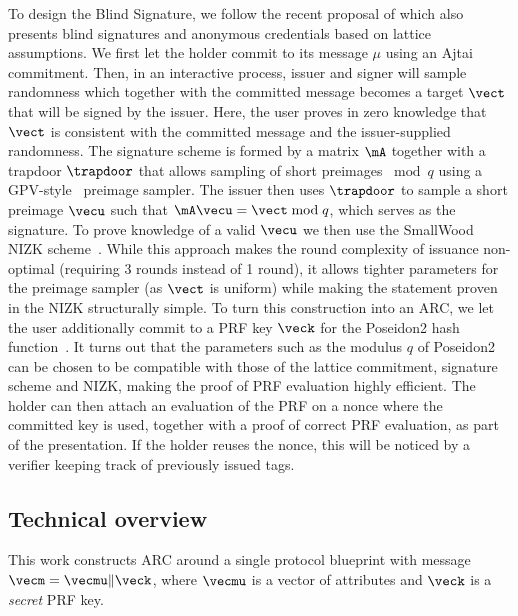 To design the Blind Signature, we follow the recent proposal of \cite{C:BLNS23,CCS:LyuSeiSte24,PKC:DKLW25} which also presents blind signatures and anonymous credentials based on lattice assumptions. We first let the holder commit to its message $\mu$ using an Ajtai commitment. Then, in an interactive process, issuer and signer will sample randomness which together with the committed message becomes  a target \(\vect\)  that will be signed by the issuer. Here, the user proves in zero knowledge that \(\vect\) is consistent with the committed message and the issuer-supplied randomness. The signature scheme is formed by a matrix $\mA$ together with a trapdoor $\trapdoor$ that allows sampling of short preimages $\bmod q$ using a GPV-style~\cite{STOC:GenPeiVai08} preimage sampler.
	The issuer then uses $\trapdoor$ to sample a short preimage \(\vecu\) such that \(\mA \vecu=\vect \bmod q\), which serves as the signature. To prove knowledge of a valid $\vecu$ we then use the SmallWood NIZK scheme~\cite{EPRINT:FenRiv25b}. While this approach makes the round complexity of issuance non-optimal (requiring 3 rounds instead of 1 round), it allows tighter parameters for the preimage sampler (as $\vect$ is uniform) while making the statement proven in the NIZK structurally simple. To turn this construction into an ARC, we let the user additionally commit to a PRF key $\veck$ for the Poseidon2 hash function~\cite{AFRICACRYPT:GraKhoSch23}. It turns out that the parameters such as the modulus $q$ of Poseidon2 can be chosen to be compatible with those of the lattice commitment, signature scheme and NIZK, making the proof of PRF evaluation highly efficient. The holder can then attach an evaluation of the PRF on a nonce where the committed key is used, together with a proof of correct PRF evaluation, as part of the presentation. If the holder reuses the nonce, this will be noticed by a verifier keeping track of previously issued tags.



\subsection{Technical overview}

This work constructs ARC around a single protocol blueprint with message  \(\vecm=\vecmu\Vert \veck\), where \(\vecmu\) is a vector of
attributes and \(\veck\) is a \emph{secret} PRF key.

